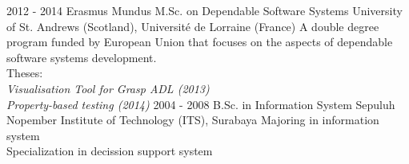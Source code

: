 \documentclass[]{friggeri-cv}
\begin{document}
\begin{entrylist}
  \entry
	{2012 - 2014}
	{Erasmus Mundus M.Sc. on Dependable Software Systems}
	{University of St. Andrews (Scotland), Universit\'{e} de Lorraine (France)}
	{A double degree program funded by European Union that focuses on the aspects
	of dependable software systems development.\\
	Theses:\\
	\emph{Visualisation Tool for Grasp ADL (2013)}\\
	\emph{Property-based testing (2014)}}
  \entry
	{2004 - 2008}
	{B.Sc. in Information System}
	{Sepuluh Nopember Institute of Technology (ITS), Surabaya}
	{Majoring in information system\\
	Specialization in decission support system}
\end{entrylist}
\end{document}

